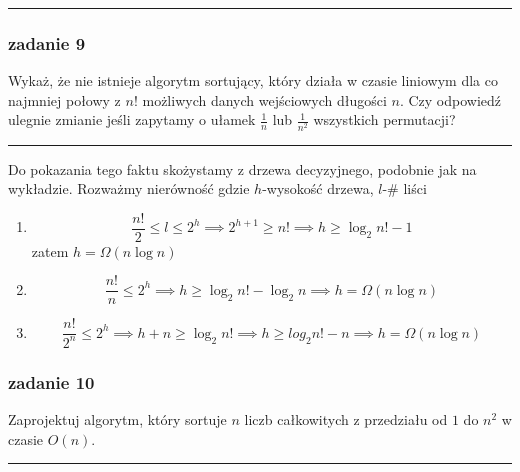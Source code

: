 \documentclass[11pt,a4paper]{article}
\begin{document}
\bigskip
\hrule
\bigskip


\subsubsection{zadanie 9}
Wykaż, że nie istnieje algorytm sortujący, który działa w czasie liniowym dla co najmniej połowy z $n!$ możliwych danych wejściowych długości $n$. Czy odpowiedź ulegnie zmianie jeśli zapytamy o ułamek $\frac{1}{n}$ lub $\frac{1}{n^2}$ wszystkich permutacji?

\bigskip
\hrule
\bigskip

Do pokazania tego faktu skożystamy z drzewa decyzyjnego, podobnie jak na wykładzie. Rozważmy nierówność gdzie $h$-wysokość drzewa, $l$-# liści
\begin{enumerate}
    \item
        \[
            \frac{n!}{2} \leq l \leq 2^h \implies 2^{h+1} \geq n! \implies h \geq \log_2 n! -1
        \]
        zatem $h = \Omega (n \log n)$
    \item
        \[
            \frac{n!}{n} \leq 2^h \implies h \geq \log_2 n! - \log_2 n \implies h = \Omega(n \log n)
        \]
    \item
        \[
            \frac{n!}{2^n} \leq 2^h \implies h+n \geq \log_2 n! \implies h \geq log_2 n! - n \implies h = \Omega(n \log n)
        \]
\end{enumerate}

\subsubsection{zadanie 10}
Zaprojektuj algorytm, który sortuje $n$ liczb całkowitych z przedziału od $1$ do $n^2$ w czasie $O(n)$.

\bigskip
\hrule
\bigskip

\end{document}
